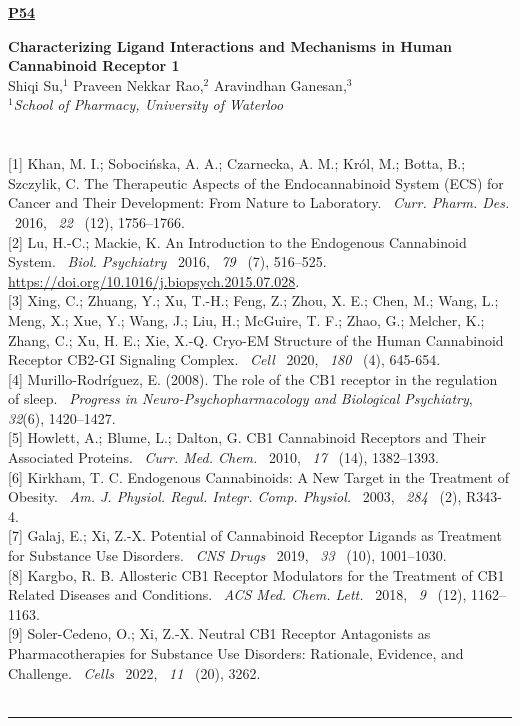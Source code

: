 \documentclass[titlepage,oneside,openany,10pt]{book}
\newenvironment{posterabswref}[5] %
        {
        \newcommand{\posterref}{#5}
	\begin{flushright}
                \underline{\textbf{#4}}
        \end{flushright}
        \textbf{#1}\\%
        #2\\%
        \textit{#3}\\\\%
        }
        {
        \vspace{0.5cm}
        \\\noindent \posterref \\ \noindent\rule{15cm}{0.5pt}%
        }
\begin{document}
\newpage

\begin{posterabswref}
    {Characterizing Ligand Interactions and Mechanisms in Human Cannabinoid Receptor 1}
    {Shiqi Su,$^{1}$ Praveen Nekkar Rao,$^{2}$ Aravindhan Ganesan,$^{3}$}
    {
    $^1$School of Pharmacy, University of Waterloo
    }
    {P54}
    {
    {[1]} Khan, M. I.; Sobocińska, A. A.; Czarnecka, A. M.; Król, M.; Botta, B.; Szczylik, C. The Therapeutic Aspects of the Endocannabinoid System (ECS) for Cancer and Their Development: From Nature to Laboratory.~ \emph{Curr. Pharm. Des.} ~2016,~ \emph{22} ~(12), 1756--1766.\\
    {[2]} Lu, H.-C.; Mackie, K. An Introduction to the Endogenous Cannabinoid System.~ \emph{Biol. Psychiatry} ~2016,~ \emph{79} ~(7), 516--525. \url{https://doi.org/10.1016/j.biopsych.2015.07.028}.\\
    {[3]} Xing, C.; Zhuang, Y.; Xu, T.-H.; Feng, Z.; Zhou, X. E.; Chen, M.; Wang, L.; Meng, X.; Xue, Y.; Wang, J.; Liu, H.; McGuire, T. F.; Zhao, G.; Melcher, K.; Zhang, C.; Xu, H. E.; Xie, X.-Q. Cryo-EM Structure of the Human Cannabinoid Receptor CB2-GI Signaling Complex.~ \emph{Cell} ~2020,~ \emph{180} ~(4), 645-654.\\
    {[4]} Murillo-Rodríguez, E. (2008). The role of the CB1 receptor in the regulation of sleep.~ \emph{Progress in Neuro-Psychopharmacology and Biological Psychiatry},~ \emph{32}(6), 1420--1427.\\
    {[5]} Howlett, A.; Blume, L.; Dalton, G. CB1 Cannabinoid Receptors and Their Associated Proteins.~ \emph{Curr. Med. Chem.} ~2010,~ \emph{17} ~(14), 1382--1393.\\
    {[6]} Kirkham, T. C. Endogenous Cannabinoids: A New Target in the Treatment of Obesity.~ \emph{Am. J. Physiol. Regul. Integr. Comp. Physiol.} ~2003,~ \emph{284} ~(2), R343-4.\\
    {[7]} Galaj, E.; Xi, Z.-X. Potential of Cannabinoid Receptor Ligands as Treatment for Substance Use Disorders.~ \emph{CNS Drugs} ~2019,~ \emph{33} ~(10), 1001--1030.\\
    {[8]} Kargbo, R. B. Allosteric CB1 Receptor Modulators for the Treatment of CB1 Related Diseases and Conditions.~ \emph{ACS Med. Chem. Lett.} ~2018,~ \emph{9} ~(12), 1162--1163.\\
    {[9]} Soler-Cedeno, O.; Xi, Z.-X. Neutral CB1 Receptor Antagonists as Pharmacotherapies for Substance Use Disorders: Rationale, Evidence, and Challenge.~ \emph{Cells} ~2022,~ \emph{11} ~(20), 3262.\\
}
\end{posterabswref}
\end{document}
